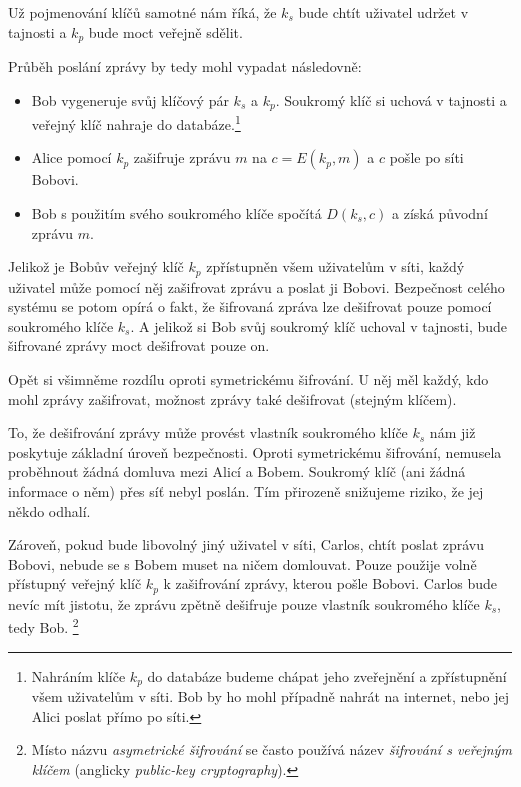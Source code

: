 \documentclass[
  program=infoi,
  biblatex,
  figures=false,
  glossaries,
  index
]{kidiplom}
\begin{document}
    Už pojmenování klíčů samotné nám říká, že $k_s$ bude chtít uživatel udržet v tajnosti a $k_p$ bude moct veřejně sdělit.

    \medskip

    Průběh poslání zprávy by tedy mohl vypadat následovně:

    \begin{itemize}
        \item
            Bob vygeneruje svůj klíčový pár $k_s$ a $k_p$.
            Soukromý klíč si uchová v tajnosti a veřejný klíč nahraje do databáze.\footnote{Nahráním klíče $k_p$ do databáze budeme chápat
            jeho zveřejnění a zpřístupnění všem uživatelům v síti. Bob by ho mohl případně nahrát na internet, nebo jej Alici poslat přímo po síti.}
        \item
            Alice pomocí $k_p$ zašifruje zprávu $m$ na $c=E(k_p, m)$ a $c$ pošle po síti Bobovi.
        \item 
            Bob s použitím svého soukromého klíče spočítá $D(k_s, c)$ a získá původní zprávu $m$.
    \end{itemize}

    Jelikož je Bobův veřejný klíč $k_p$ zpřístupněn všem uživatelům v síti, každý uživatel může pomocí něj zašifrovat zprávu a poslat ji Bobovi.
    Bezpečnost celého systému se potom opírá o fakt, že šifrovaná zpráva lze dešifrovat pouze pomocí soukromého klíče $k_s$.
    A jelikož si Bob svůj soukromý klíč uchoval v tajnosti, bude šifrované zprávy moct dešifrovat pouze on.

    \begin{remark}
        Opět si všimněme rozdílu oproti symetrickému šifrování.
        U něj měl každý, kdo mohl zprávy zašifrovat, možnost zprávy také dešifrovat (stejným klíčem).
    \end{remark}

    To, že dešifrování zprávy může provést vlastník soukromého klíče $k_s$ nám již poskytuje základní úroveň bezpečnosti.
    Oproti symetrickému šifrování, nemusela proběhnout žádná domluva mezi Alicí a Bobem.
    Soukromý klíč (ani žádná informace o něm) přes síť nebyl poslán. Tím přirozeně snižujeme riziko, že jej někdo odhalí.

    Zároveň, pokud bude libovolný jiný uživatel v síti, Carlos, chtít poslat zprávu Bobovi, nebude se s Bobem muset na ničem domlouvat.
    Pouze použije volně přístupný veřejný klíč $k_p$ k zašifrování zprávy, kterou pošle Bobovi.
    Carlos bude nevíc mít jistotu, že zprávu zpětně dešifruje pouze vlastník soukromého klíče $k_s$, tedy Bob.
    \footnote{Místo názvu \emph{asymetrické šifrování} se často používá
    název \emph{šifrování s veřejným klíčem} (anglicky \emph{public-key cryptography}).}
\end{document}
